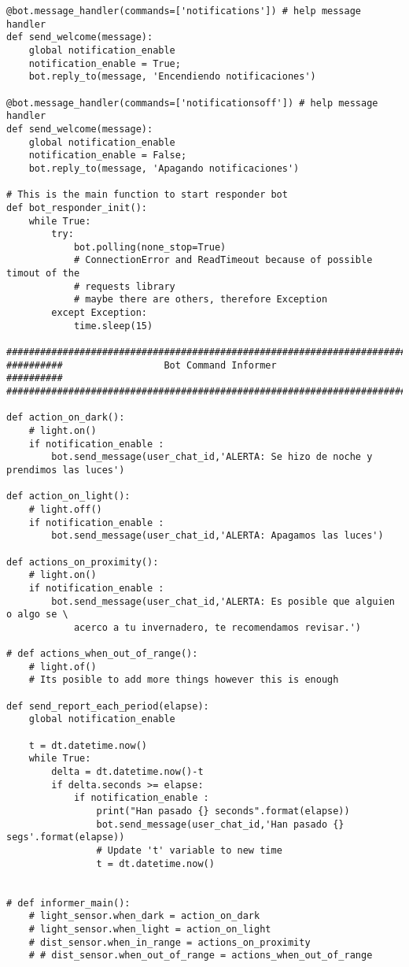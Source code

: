 \documentclass{article}
\begin{document}
\begin{lstlisting}
@bot.message_handler(commands=['notifications']) # help message handler
def send_welcome(message):
    global notification_enable
    notification_enable = True;
    bot.reply_to(message, 'Encendiendo notificaciones')

@bot.message_handler(commands=['notificationsoff']) # help message handler
def send_welcome(message):
    global notification_enable
    notification_enable = False;
    bot.reply_to(message, 'Apagando notificaciones')

# This is the main function to start responder bot
def bot_responder_init():
    while True:
        try:
            bot.polling(none_stop=True)
            # ConnectionError and ReadTimeout because of possible timout of the
            # requests library
            # maybe there are others, therefore Exception
        except Exception:
            time.sleep(15)

###############################################################################
##########                  Bot Command Informer                     ##########
###############################################################################

def action_on_dark():
    # light.on()
    if notification_enable :
        bot.send_message(user_chat_id,'ALERTA: Se hizo de noche y prendimos las luces')

def action_on_light():
    # light.off()
    if notification_enable :
        bot.send_message(user_chat_id,'ALERTA: Apagamos las luces')

def actions_on_proximity():
    # light.on()
    if notification_enable :
        bot.send_message(user_chat_id,'ALERTA: Es posible que alguien o algo se \
            acerco a tu invernadero, te recomendamos revisar.')

# def actions_when_out_of_range():
    # light.of()
    # Its posible to add more things however this is enough

def send_report_each_period(elapse):
    global notification_enable

    t = dt.datetime.now()
    while True:
        delta = dt.datetime.now()-t
        if delta.seconds >= elapse:
            if notification_enable :
                print("Han pasado {} seconds".format(elapse))
                bot.send_message(user_chat_id,'Han pasado {} segs'.format(elapse))
                # Update 't' variable to new time
                t = dt.datetime.now()


# def informer_main():
    # light_sensor.when_dark = action_on_dark
    # light_sensor.when_light = action_on_light
    # dist_sensor.when_in_range = actions_on_proximity
    # # dist_sensor.when_out_of_range = actions_when_out_of_range


\end{lstlisting}
\end{document}
